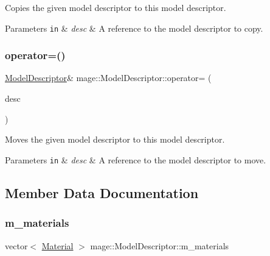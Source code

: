 Copies the given model descriptor to this model descriptor.


\begin{DoxyParams}[1]{Parameters}
\mbox{\tt in}  & {\em desc} & A reference to the model descriptor to copy. \\
\hline
\end{DoxyParams}
\hypertarget{classmage_1_1_model_descriptor_ae2ae685569c0ae534d9f0b5622a807d0}{}\label{classmage_1_1_model_descriptor_ae2ae685569c0ae534d9f0b5622a807d0} 
\subsubsection{\texorpdfstring{operator=()}{operator=()}\hspace{0.1cm}{\footnotesize\ttfamily [2/2]}}
{\footnotesize\ttfamily \hyperlink{classmage_1_1_model_descriptor}{Model\+Descriptor}\& mage\+::\+Model\+Descriptor\+::operator= (\begin{DoxyParamCaption}\item[{\hyperlink{classmage_1_1_model_descriptor}{Model\+Descriptor} \&\&}]{desc }\end{DoxyParamCaption})\hspace{0.3cm}{\ttfamily [delete]}}

Moves the given model descriptor to this model descriptor.


\begin{DoxyParams}[1]{Parameters}
\mbox{\tt in}  & {\em desc} & A reference to the model descriptor to move. \\
\hline
\end{DoxyParams}


\subsection{Member Data Documentation}
\hypertarget{classmage_1_1_model_descriptor_a672238b257f99836243d84f634ffeea2}{}\label{classmage_1_1_model_descriptor_a672238b257f99836243d84f634ffeea2} 
\subsubsection{\texorpdfstring{m\+\_\+materials}{m\_materials}}
{\footnotesize\ttfamily vector$<$ \hyperlink{structmage_1_1_material}{Material} $>$ mage\+::\+Model\+Descriptor\+::m\+\_\+materials\hspace{0.3cm}{\ttfamily [private]}}

